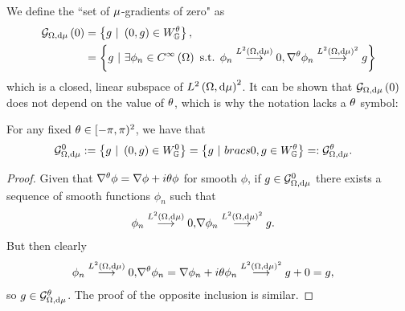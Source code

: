 We define the ``set of $\mu$-gradients of zero" as
\begin{align} \label{eq:GradZeroDef}
	\mathcal{G}_{ \Omega, \mathrm{d}\mu}\left( 0 \right) &= \left\{  g \ \vert \ \left( 0,g \right)\in W^{\theta}_{\mathbb{G}}  \right\}, \\
	&= \left\{  g \ \vert \ \exists\phi_n\in C^{\infty}\left( \Omega \right) \text{ s.t. } \phi_n\overset{L^{2}\left( \Omega,\mathrm{d}\mu \right)}{\longrightarrow}0, \nabla^{\theta}\phi_n\overset{L^{2}\left( \Omega,\mathrm{d}\mu \right)^2}{\longrightarrow}g  \right\}
\end{align}
which is a closed, linear subspace of $L^{2}\left( \Omega,\mathrm{d}\mu \right)^2$. 
It can be shown that $\mathcal{G}_{ \Omega, \mathrm{d}\mu}\left( 0 \right)$ does not depend on the value of $\theta$, which is why the notation lacks a $\theta$ symbol:
\begin{prop} \label{prop:GradZeroInvarientUnderQM}
	For any fixed $\theta\in[-\pi,\pi)^2$, we have that
	\begin{align*}
		\mathcal{G}^0_{\ddom, \md \ddmes} := \clbracs{ g \ \vert \ \bracs{0,g}\in W^0_\graph} &= 
		\clbracs{ g \ \vert \ bracs{0,g}\in W^{\qm}_\graph } =: \mathcal{G}^{\qm}_{\ddom, \md \ddmes}.
	\end{align*}
\end{prop}
\begin{proof}
	Given that $\nabla^{\theta}\phi = \nabla\phi + i\theta\phi$ for smooth $\phi$, if $g\in\mathcal{G}^0_{\Omega, \mathrm{d} \mu}$ there exists a sequence of smooth functions $\phi_n$ such that 
	\begin{align*}
		\phi_n\overset{L^{2}\left( \Omega,\mathrm{d}\mu \right)}{\longrightarrow}0, &\nabla\phi_n\overset{L^{2}\left( \Omega,\mathrm{d}\mu \right)^2}{\longrightarrow}g.
	\end{align*}
	But then clearly
	\begin{align*}
		\phi_n\overset{L^{2}\left( \Omega,\mathrm{d}\mu \right)}{\longrightarrow}0, &\nabla^{\theta}\phi_n = \nabla\phi_n + i\theta\phi_n \overset{L^{2}\left( \Omega,\mathrm{d}\mu \right)^2}{\longrightarrow} g + 0 = g,
	\end{align*}
	so $g\in\mathcal{G}^\theta_{\Omega, \mathrm{d} \mu}$.
	The proof of the opposite inclusion is similar.
\end{proof}

